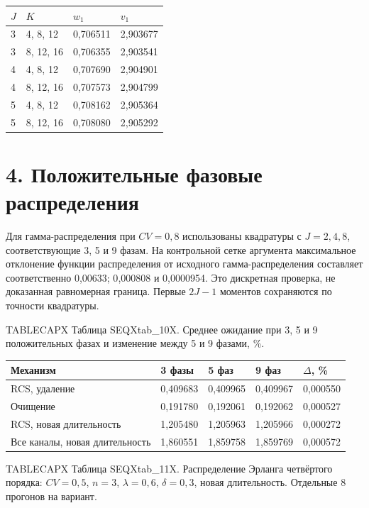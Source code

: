 \setlength{\tabcolsep}{2pt}
\begin{tabular}{p{1.42cm}p{4.72cm}p{4.72cm}p{4.72cm}}
\toprule
$J$ & $K$ & $w_1$ & $v_1$ \\
\midrule
3 & 4, 8, 12 & 0,706511 & 2,903677 \\
3 & 8, 12, 16 & 0,706355 & 2,903541 \\
4 & 4, 8, 12 & 0,707690 & 2,904901 \\
4 & 8, 12, 16 & 0,707573 & 2,904799 \\
5 & 4, 8, 12 & 0,708162 & 2,905364 \\
5 & 8, 12, 16 & 0,708080 & 2,905292 \\
\bottomrule
\end{tabular}






\section*{4. Положительные фазовые распределения}
Для гамма-распределения при \(CV=0{,}8\) использованы квадратуры с \(J=2,4,8\), соответствующие 3, 5 и 9 фазам. На контрольной сетке аргумента максимальное отклонение функции распределения от исходного гамма-распределения составляет соответственно 0{,}00633; 0{,}000808 и 0{,}0000954. Это дискретная проверка, не доказанная равномерная граница. Первые \(2J-1\) моментов сохраняются по точности квадратуры.

\noindent TABLECAPX Таблица SEQXtab_10X. Среднее ожидание при 3, 5 и 9 положительных фазах и изменение между 5 и 9 фазами, \%.\par

\setlength{\tabcolsep}{2pt}
\begin{tabular}{p{5.76cm}p{2.55cm}p{2.55cm}p{2.55cm}p{2.17cm}}
\toprule
Механизм & 3 фазы & 5 фаз & 9 фаз & $\Delta$, \% \\
\midrule
RCS, удаление & 0,409683 & 0,409965 & 0,409967 & 0,000550 \\
Очищение & 0,191780 & 0,192061 & 0,192062 & 0,000527 \\
RCS, новая длительность & 1,205480 & 1,205963 & 1,205966 & 0,000272 \\
Все каналы, новая длительность & 1,860551 & 1,859758 & 1,859769 & 0,000572 \\
\bottomrule
\end{tabular}




\noindent TABLECAPX Таблица SEQXtab_11X. Распределение Эрланга четвёртого порядка: \(CV=0{,}5\), \(n=3\), \(\lambda=0{,}6\), \(\delta=0{,}3\), новая длительность. Отдельные 8 прогонов на вариант.\par

